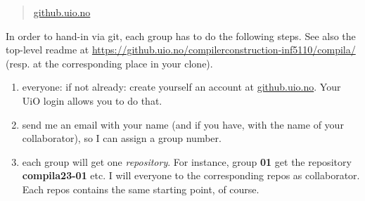 \documentclass[10pt,freeform]{handout}[2014/08/13]
\begin{document}
\begin{quote}
  \url{github.uio.no}
\end{quote}


In order to hand-in via git, each group has to do the following steps. See
also the top-level readme at
\url{https://github.uio.no/compilerconstruction-inf5110/compila/} (resp. at
the corresponding place in your clone).

\begin{enumerate}
\item everyone: if not already: create yourself an account at
  \url{github.uio.no}. Your UiO login allows you to do that.
\item send me an email with your name (and if you have, with the name of
  your collaborator), so I can assign a group number.
\item each group will get one \emph{repository}. For instance, group
  \textbf{01} get the repository \textbf{compila23-01} etc.  I will
  everyone to the corresponding repos as collaborator. Each repos contains
  the same starting point, of course.
\end{enumerate}
\end{document}
